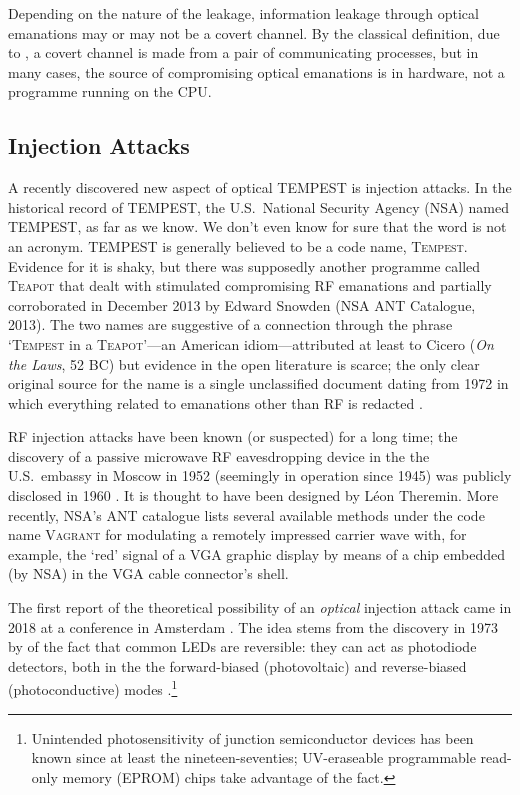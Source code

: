 \documentclass[a4paper,twoside,11pt,openany]{book}
\begin{document}
Depending on the nature of the leakage, information leakage through optical
emanations may or may not be a covert channel. By the classical definition,
due to \cite{Lampson1973}, a covert channel is made from a pair of
communicating processes, but in many cases, the source of compromising optical
emanations is in hardware, not a programme running on the CPU.

\subsection{Injection Attacks}

A recently discovered new aspect of optical TEMPEST is injection attacks. In
the historical record of TEMPEST, the U.S.\ National Security Agency (NSA)
named TEMPEST, as far as we know. We don't even know for sure that the word is
not an acronym. TEMPEST is generally believed to be a code name,
\textsc{Tempest}. Evidence for it is shaky, but there was supposedly
another programme called \textsc{Teapot} that dealt with stimulated
compromising RF emanations \cite[p.~539]{Anderson2008a} and partially
corroborated in December 2013 by Edward Snowden (NSA ANT
Catalogue, 2013). The two names are suggestive of a connection through the phrase
`\textsc{Tempest} in a \textsc{Teapot}'---an American idiom---attributed at
least to Cicero (\emph{On the Laws}, 52 BC) \cite[p.~173]{Cicero2017}
but evidence in the open literature is scarce; the only clear original source
for the name is a single unclassified document dating from 1972 in which
everything related to emanations other than RF is redacted
\cite{NSAtempest2007}.

RF injection attacks have been known (or suspected) for a long time; the
discovery of a passive microwave RF eavesdropping device in the the U.S.\
embassy in Moscow in 1952 (seemingly in operation since 1945) was publicly
disclosed in 1960 \cite{Stong1968a}. It is thought to have been designed by
L\'{e}on Theremin. More recently, NSA's ANT catalogue lists several available
methods under the code name \textsc{Vagrant} for modulating a remotely
impressed carrier wave with, for example, the `red' signal of a VGA graphic
display by means of a chip embedded (by NSA) in the VGA cable connector's
shell.

The first report of the theoretical possibility of an \emph{optical} injection
attack came in 2018 at a conference in Amsterdam \cite{Loughry2018a}. The idea
stems from the discovery in 1973 by \citeauthor{Mims1973b} of the fact that
common LEDs are reversible: they can act as photodiode detectors, both in the 
the forward-biased (photovoltaic) and reverse-biased (photoconductive) modes
\cite{Mims1973b}.\footnote{Unintended photosensitivity of junction
semiconductor devices has been known since at least the nineteen-seventies;
UV-eraseable programmable read-only memory (EPROM) chips take advantage of the
fact.}
\end{document}
